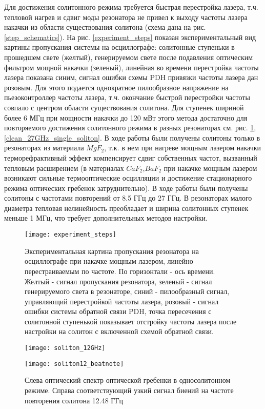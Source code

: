 Для достижения солитонного режима требуется быстрая перестройка лазера, т.ч. тепловой нагрев и сдвиг моды резонатора не привел к выходу частоты лазера накачки из области существования солитона (схема дана на рис. \ref{step_schematics}). На рис. \ref{experiment_steps} показан экспериментальный вид картины пропускания системы на осциллографе: солитонные ступеньки в прошедшем свете (желтый), генерируемом свете после подавления оптическим фильтром мощной накачки (зеленый), линейная во времени перестройка частоты лазера показана синим, сигнал ошибки схемы PDH привязки частоты лазера дан розовым. Для этого подается однократное пилообразное напряжение на пьезоконтроллер частоты лазера, т.ч. окончание быстрой перестройки частоты совпало с центром области существования солитона. Для ступенек шириной более 6 МГц при мощности накачки до 120 мВт этого метода достаточно для повторяемого достижения солитонного режима в разных резонаторах см. рис. \ref{soliton_12GHz},\ref{clean_27GHz_single_soliton}. В ходе работы были получены солитоны только в резонаторах из материала $MgF_2$, т.к. в нем при нагреве мощным лазером накачки терморефрактивный эффект компенсирует сдвиг собственных частот, вызванный тепловым расширением (в материалах $CaF_2$,$BaF_2$ при накачке мощным лазером возникают сильные термооптические осцилляции и достижение стационарного режима оптических гребенок затруднительно). В ходе работы были получены солитоны с частотами повторений от 8.5 ГГц до 27 ГГц. В резонаторах малого диаметра тепловая нелинейность преобладает и ширина солитонных ступенек меньше 1 МГц, что требует дополнительных методов настройки.

\begin{figure}[ht]
\texttt{[image: experiment\_steps]}\centering
\caption{Экспериментальная картина пропускания резонатора на осциллографе при накачке мощным лазером, линейно перестраиваемым по частоте. По горизонтали - ось времени. Желтый - сигнал пропускания резонатора, зеленый - сигнал генерируемого света в резонаторе, синий - пилообразный сигнал, управляющий перестройкой частоты лазера, розовый - сигнал ошибки системы обратной связи PDH, точка пересечения с солитонной ступенькой показывает отстройку частоты лазера после настройки на солитон с включенной схемой обратной связи.}
\end{figure}

\begin{figure}[ht]
  \begin{minipage}[ht]{0.49\linewidth}\centering
    \texttt{[image: soliton\_12GHz]}
  \end{minipage}
  \hfill
  \begin{minipage}[ht]{0.49\linewidth}\centering
    \texttt{[image: soliton12\_beatnote]}
  \end{minipage}
  \caption{Слева оптический спектр оптической гребенки в односолитонном режиме. Справа соответствующий узкий сигнал биений на частоте повторения солитона 12.48 ГГц}
  \label{soliton_12GHz}
\end{figure}


